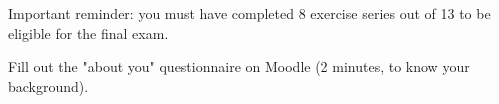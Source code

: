 \begin{frame}
Important reminder: you must have completed 8 exercise series out of 13 to be eligible for the final exam.
\end{frame}

\begin{frame}
Fill out the "about you" questionnaire on Moodle (2 minutes, to know your background).
\end{frame}




